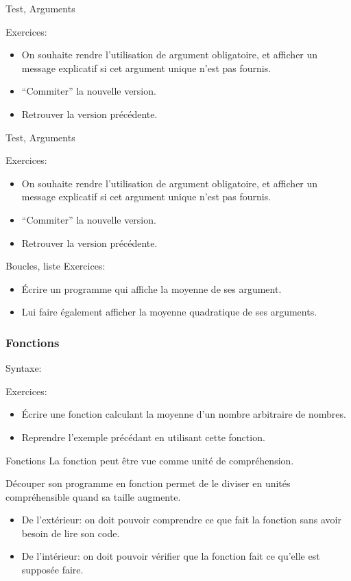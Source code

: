 \documentclass{beamer}
\begin{document}
\begin{frame}{Test, Arguments}
  
  Exercices:
  \begin{itemize}
  \item On souhaite rendre l'utilisation de argument obligatoire, et afficher un message explicatif si cet argument unique n'est pas fournis.
  \item ``Commiter''  la nouvelle version.
  \item Retrouver la version précédente.
  \end{itemize}
\end{frame}

\begin{frame}{Test, Arguments}
  
  Exercices:
  \begin{itemize}
  \item On souhaite rendre l'utilisation de argument obligatoire, et afficher un message explicatif si cet argument unique n'est pas fournis.
  \item ``Commiter''  la nouvelle version.
  \item Retrouver la version précédente.
  \end{itemize}
\end{frame}

\begin{frame}{Boucles, liste}
  Exercices:
  \begin{itemize}
  \item Écrire un programme qui affiche la moyenne de ses argument.
  \item Lui faire également afficher la moyenne quadratique de ses arguments.
  \end{itemize}
\end{frame}

\begin{frame}[fragile]\frametitle{Fonctions}
  Syntaxe:
  \fbox{}

  Exercices:
  \begin{itemize}
  \item Écrire une fonction calculant la moyenne d'un nombre arbitraire de nombres.
  \item Reprendre l'exemple précédant en utilisant cette fonction.
  \end{itemize}
\end{frame}

\begin{frame}{Fonctions}
  La fonction peut être vue comme unité de compréhension.
  
  Découper son programme en fonction permet de le diviser en unités compréhensible quand sa taille augmente.

  \begin{itemize}
  \item De l'extérieur: on doit pouvoir comprendre ce que fait la fonction sans avoir besoin de lire son code.
  \item De l'intérieur: on doit pouvoir vérifier que la fonction fait ce qu'elle est supposée faire.
  \end{itemize}
\end{frame}
\end{document}
